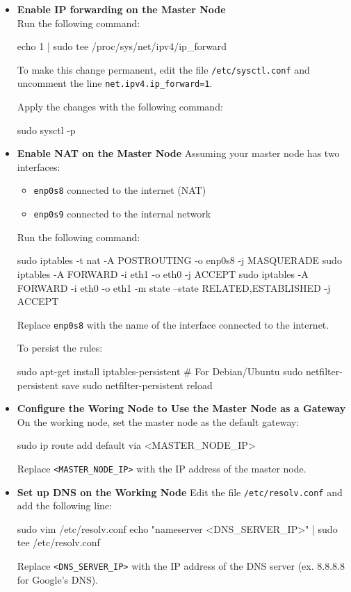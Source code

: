 \begin{itemize}
    \item \textbf{Enable IP forwarding on the Master Node}
    \\Run the following command:
    \begin{codeblock}[language=bash]
echo 1 | sudo tee /proc/sys/net/ipv4/ip\_forward
    \end{codeblock}
    To make this change permanent, edit the file \texttt{/etc/sysctl.conf} and uncomment the line \texttt{net.ipv4.ip\_forward=1}.

    Apply the changes with the following command:
    \begin{codeblock}[language=bash]
sudo sysctl -p
    \end{codeblock}
    
    \item \textbf{Enable NAT on the Master Node}
    Assuming your master node has two interfaces:
    \begin{itemize}
        \item \texttt{enp0s8} connected to the internet (NAT)
        \item \texttt{enp0s9} connected to the internal network
    \end{itemize}
    

    Run the following command:
    \begin{codeblock}[language=bash]
sudo iptables -t nat -A POSTROUTING -o enp0s8 -j MASQUERADE
sudo iptables -A FORWARD -i eth1 -o eth0 -j ACCEPT
sudo iptables -A FORWARD -i eth0 -o eth1 -m state --state RELATED,ESTABLISHED -j ACCEPT
    \end{codeblock}
    Replace \texttt{enp0s8} with the name of the interface connected to the internet.
    
    To persist the rules:
    \begin{codeblock}[language=bash]
sudo apt-get install iptables-persistent # For Debian/Ubuntu 
sudo netfilter-persistent save
sudo netfilter-persistent reload
    \end{codeblock}
    \item \textbf{Configure the Woring Node to Use the Master Node as a Gateway}
    On the working node, set the master node as the default gateway:
    \begin{codeblock}[language=bash]
sudo ip route add default via <MASTER\_NODE\_IP>
    \end{codeblock}
    Replace \texttt{<MASTER\_NODE\_IP>} with the IP address of the master node.
    \item \textbf{Set up DNS on the Working Node}
    Edit the file \texttt{/etc/resolv.conf} and add the following line:
    \begin{codeblock}[language=bash]
sudo vim /etc/resolv.conf
echo "nameserver <DNS\_SERVER\_IP>" | sudo tee /etc/resolv.conf
    \end{codeblock}
    Replace \texttt{<DNS\_SERVER\_IP>} with the IP address of the DNS server (ex. 8.8.8.8 for Google's DNS).


\end{itemize}
